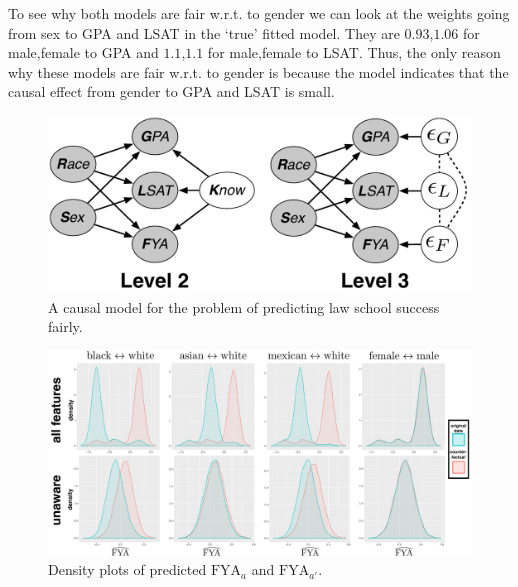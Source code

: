 To see why both models are fair w.r.t. to gender we can look at the weights going from sex to GPA and LSAT in the `true' fitted model. They are $0.93$,$1.06$ for male,female to GPA and $1.1$,$1.1$ for male,female to LSAT. Thus, the only reason why these models are fair w.r.t. to gender is because the model indicates that the causal effect from gender to GPA and LSAT is small.


 


\begin{figure}[th]
\begin{center}
\vspace{-1ex}
\centerline{\includegraphics[width=0.8\columnwidth]{law_school_model}}
\vspace{-2ex}
\caption{A causal model for the problem of predicting law school success fairly.\label{figure.law_school}\vspace{-2ex}}
\vspace{-2ex}
\end{center}
\end{figure}


\begin{figure}[th]
\begin{center}
 \label{figure.counterfactual}
\vspace{-1ex}
\centerline{\includegraphics[width=\columnwidth]{counterfactual}}
\vspace{-2ex}
\caption{Density plots of predicted $\mbox{FYA}_a$ and $\mbox{FYA}_{a'}$.}
\vspace{-2ex}
\end{center}
\end{figure}


